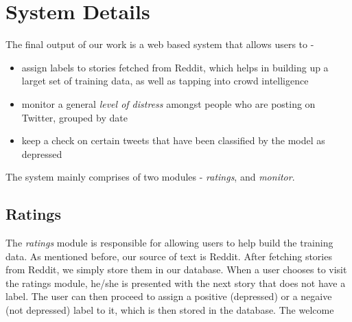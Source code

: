 \section{System Details}
The final output of our work is a web based system that allows users to -
\begin{itemize}
    \item{assign labels to stories fetched from Reddit, which helps in building up a larget set of training data, as well as tapping into crowd intelligence}
    \item{monitor a general \emph{level of distress} amongst people who are posting on Twitter, grouped by date}
    \item{keep a check on certain tweets that have been classified by the model as depressed}
\end{itemize}

The system mainly comprises of two modules - \emph{ratings}, and \emph{monitor}.

\subsection{Ratings}
The \emph{ratings} module is responsible for allowing users to help build the training data. As mentioned before, our source of text is Reddit. After fetching stories from Reddit, we simply store them in our database. When a user chooses to visit the ratings module, he/she is presented with the next story that does not have a label. The user can then proceed to assign a positive (depressed) or a negaive (not depressed) label to it, which is then stored in the database. The welcome 
